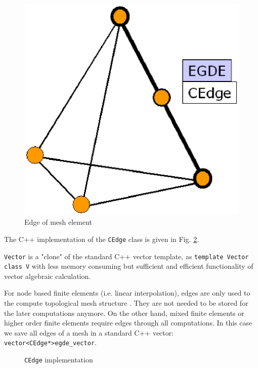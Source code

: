 \begin{figure}[H]
\centering
\includegraphics[scale=0.4]{figures/edge_new.eps}
\caption{Edge of mesh element} \label{fig:gedge}
\end{figure}

The C++ implementation of the \texttt{CEdge} class is given in
Fig. \ref{fig:edge}.

\texttt{Vector} is a "clone" of the standard C++ vector template,
as \texttt{template Vector class V} with less memory consuming but sufficient
and efficient functionality of vector algebraic calculation.

For node based finite elements (i.e. linear
interpolation), edges are only used to the compute topological mesh
structure . They are not
needed to be stored for the later computations anymore. On the other
hand, mixed finite elements or higher order finite elements require
edges through all computations. In this case we save all edges of a
mesh in a standard C++ vector: \texttt{vector<CEdge*>egde\_vector}.

\begin{figure}[H]
\centering
{}
\caption{\texttt{CEdge} implementation}
\label{fig:edge}
\end{figure}

